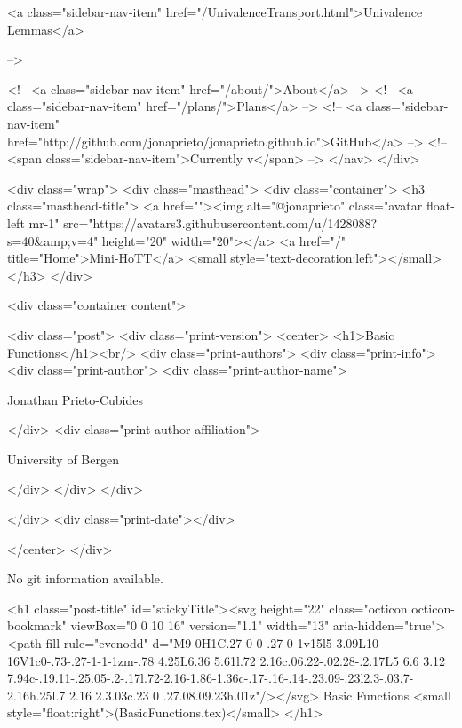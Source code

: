       
    
      
        
          <a class="sidebar-nav-item" href="/UnivalenceTransport.html">Univalence Lemmas</a>
        
      
     -->

    <!-- <a class="sidebar-nav-item" href="/about/">About</a> -->
    <!-- <a class="sidebar-nav-item" href="/plans/">Plans</a> -->
    <!-- <a class="sidebar-nav-item" href="http://github.com/jonaprieto/jonaprieto.github.io">GitHub</a> -->
    <!-- <span class="sidebar-nav-item">Currently v</span> -->
  </nav>
</div>

    <div class="wrap">
      <div class="masthead">
        <div class="container">
          <h3 class="masthead-title">
            <a href=""><img alt="@jonaprieto" class="avatar float-left mr-1" src="https://avatars3.githubusercontent.com/u/1428088?s=40&amp;v=4" height="20" width="20"></a>
            <a href="/" title="Home">Mini-HoTT</a>
            <small style="text-decoration:left"></small>
          </h3>
        </div>
      
      <div class="container content">
        







<div class="post">
  <div class="print-version">
    <center>
      <h1>Basic Functions</h1><br/>
        <div class="print-authors">
          <div class="print-info">
            <div class="print-author">
              <div class="print-author-name">
                
                  Jonathan Prieto-Cubides
                
              </div>
              <div class="print-author-affiliation">
                
                  University of Bergen
                
                </div>
            </div>
          </div>
          
          
        </div>
        <div class="print-date"></div>
        
        
    </center>
  </div>

  
  No git information available.
  

  <h1 class="post-title" id="stickyTitle"><svg height="22" class="octicon octicon-bookmark" viewBox="0 0 10 16" version="1.1" width="13" aria-hidden="true"><path fill-rule="evenodd" d="M9 0H1C.27 0 0 .27 0 1v15l5-3.09L10 16V1c0-.73-.27-1-1-1zm-.78 4.25L6.36 5.61l.72 2.16c.06.22-.02.28-.2.17L5 6.6 3.12 7.94c-.19.11-.25.05-.2-.17l.72-2.16-1.86-1.36c-.17-.16-.14-.23.09-.23l2.3-.03.7-2.16h.25l.7 2.16 2.3.03c.23 0 .27.08.09.23h.01z"/></svg> Basic Functions <small style="float:right">(BasicFunctions.tex)</small>
  </h1>

